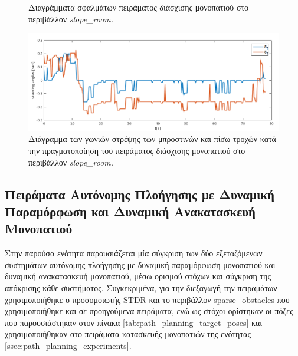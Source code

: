 \begin{figure}[!ht]
	\caption{Διαγράμματα σφαλμάτων πειράματος διάσχισης μονοπατιού στο περιβάλλον \textit{slope{\_}room.}}
	\label{fig:slope_room_errors}
\end{figure}

\begin{figure}[!ht]
	\centering
	\includegraphics[width=\linewidth]{Chapters/Chapter5/Figures/ptc_experiments/plots/slope_room/fsa_rsa.png}
	\caption{Διάγραμμα των γωνιών στρέψης των μπροστινών και πίσω τροχών κατά την πραγματοποίηση του πειράματος διάσχισης μονοπατιού στο περιβάλλον \textit{slope{\_}room.}}
	\label{fig:slope_room_fsa_rsa}
\end{figure}

\subsection{Πειράματα Αυτόνομης Πλοήγησης με Δυναμική Παραμόρφωση και Δυναμική Ανακατασκευή Μονοπατιού} \label{navigation_systems_comparison}
Στην παρούσα ενότητα παρουσιάζεται μία σύγκριση των δύο εξεταζόμενων συστημάτων αυτόνομης πλοήγησης με δυναμική παραμόρφωση μονοπατιού και δυναμική ανακατασκευή μονοπατιού, μέσω ορισμού στόχων και σύγκριση της απόκρισης κάθε συστήματος. Συγκεκριμένα, για την διεξαγωγή την πειραμάτων χρησιμοποιήθηκε ο προσομοιωτής STDR και το περιβάλλον sparse{\_}obstacles που χρησιμοποιήθηκε και σε προηγούμενα πειράματα, ενώ ως στόχοι ορίστηκαν οι πόζες που παρουσιάστηκαν στον πίνακα \ref{tab:path_planning_target_poses} και χρησιμοποιήθηκαν στο πειράματα κατασκευής μονοπατιών της ενότητας \ref{ssec:path_planning_experiments}.

